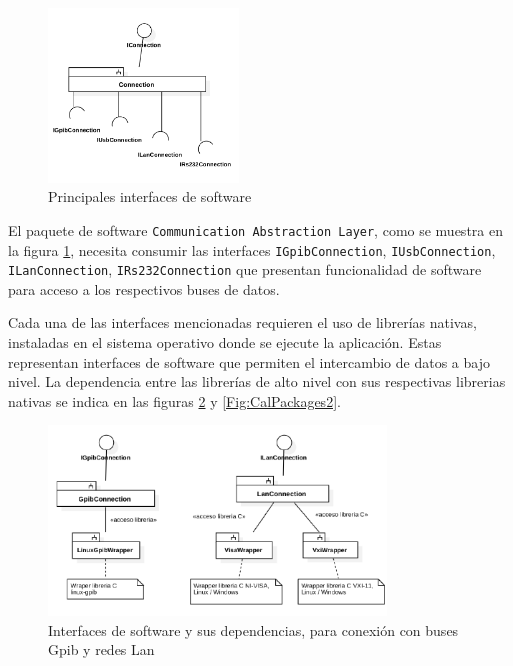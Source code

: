 \documentclass[paper=a4,oneside,fontsize=12pt]{article}
\begin{document}
	\begin{figure}[H]
		\centering
		\includegraphics[width=0.45\textwidth]{Imagenes/CommunicationAbstractionLayerPackages1.pdf}
		\caption{Principales interfaces de software}
		\label{Fig:CalPackagesMain}
	\end{figure}
	
	El paquete de software \texttt{Communication~Abstraction~Layer}, como se muestra en la figura \ref{Fig:CalPackagesMain}, necesita consumir las interfaces \texttt{IGpibConnection}, \texttt{IUsbConnection}, \texttt{ILanConnection}, \texttt{IRs232Connection} que presentan funcionalidad de software para acceso a los respectivos buses de datos. 
	
	Cada una de las interfaces mencionadas requieren el uso de librerías nativas, instaladas en el sistema operativo donde se ejecute la aplicación. Estas representan interfaces de software que permiten el intercambio de datos a bajo nivel. La dependencia entre las librerías de alto nivel con sus respectivas librerias nativas se indica en las figuras \ref{Fig:CalPackages1} y \ref{Fig:CalPackages2}.

	\begin{figure}[H]
		\centering
		\includegraphics[width=0.8\textwidth]{Imagenes/CommunicationAbstractionLayerPackages2.pdf}
		\caption{Interfaces de software y sus dependencias, para conexión con buses Gpib y redes Lan}
		\label{Fig:CalPackages1}
	\end{figure}
\end{document}
